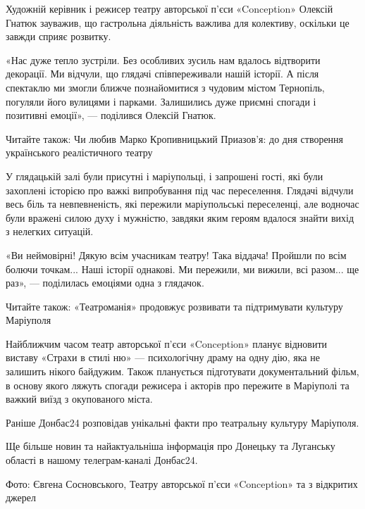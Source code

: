 Художній керівник і режисер театру авторської п'єси «Conception» Олексій Гнатюк
зауважив, що гастрольна діяльність важлива для колективу, оскільки це завжди
сприяє розвитку.

«Нас дуже тепло зустріли. Без особливих зусиль нам вдалось відтворити
декорації. Ми відчули, що глядачі співпереживали нашій історії. А після
спектаклю ми змогли ближче познайомитися з чудовим містом Тернопіль, погуляли
його вулицями і парками. Залишились дуже приємні спогади і позитивні емоції», —
поділився Олексій Гнатюк. 

Читайте також: Чи любив Марко Кропивницький Приазов'я: до дня створення
українського реалістичного театру

У глядацькій залі були присутні і маріупольці, і запрошені гості, які були
захоплені історією про важкі випробування під час переселення. Глядачі відчули
весь біль та невпевненість, які пережили маріупольські переселенці, але
водночас були вражені силою духу і мужністю, завдяки яким героям вдалося знайти
вихід з нелегких ситуацій.

«Ви неймовірні! Дякую всім учасникам театру! Така віддача! Пройшли по всім
болючи точкам... Наші історії однакові. Ми пережили, ми вижили, всі разом... ще
раз», — поділилась емоціями одна з глядачок.

Читайте також: «Театроманія» продовжує розвивати та підтримувати культуру
Маріуполя

Найближчим часом театр авторської п'єси «Conception» планує відновити виставу «Страхи в стилі ню» — психологічну драму на одну дію, яка не залишить нікого байдужим. Також планується підготувати документальний фільм, в основу якого ляжуть спогади режисера і акторів про пережите в Маріуполі та важкий виїзд з окупованого міста.

Раніше Донбас24 розповідав унікальні факти про театральну культуру Маріуполя.

Ще більше новин та найактуальніша інформація про Донецьку та Луганську області в нашому телеграм-каналі Донбас24.

Фото: Євгена Сосновського, Театру авторської п'єси «Conception» та з відкритих джерел
